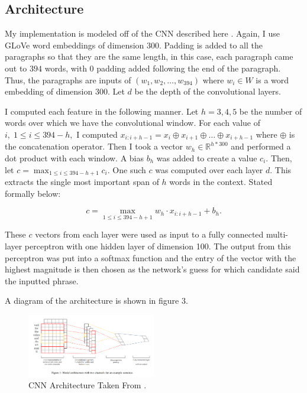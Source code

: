 \documentclass{article}
\begin{document}
\subsection{Architecture}
My implementation is modeled off of the CNN described here \cite{cnnpaper}. Again, I use GLoVe word embeddings of dimension 300. Padding is added to all the paragraphs so that they are the same length, in this case, each paragraph came out to $394$ words, with 0 padding added following the end of the paragraph. Thus, the paragraphs are inputs of $(w_1,w_2,\dots,w_{394})$ where $w_i \in W$ is a word embedding of dimension 300. Let $d$ be the depth of the convolutional layers. 

I computed each feature in the following manner. Let $h=3,4,5$ be the number of words over which we have the convolutional window. For each value of $i, \; 1\leq i \leq 394-h,$ I computed $x_{i:i+h-1} = x_i \oplus x_{i+1} \oplus \dots \oplus x_{i+h-1}$ where $\oplus$ is the concatenation operator. Then I took a vector $w_h \in \mathbb{R}^{h*300}$ and performed a dot product with each window. A bias $b_h$ was added to create a value $c_i.$ Then, let $c = \max_{1 \leq i \leq 394 - h + 1} c_i.$ One such $c$ was computed over each layer $d.$ This extracts the single most important span of $h$ words in the context. Stated formally below:

\begin{equation} c = \max_{1 \leq i \leq 394 - h + 1} w_h \cdot x_{i:i+h-1} + b_h. \end{equation}

These $c$ vectors from each layer were used as input to a fully connected multi-layer perceptron with one hidden layer of dimension 100. The output from this perceptron was put into a softmax function and the entry of the vector with the highest magnitude is then chosen as the network’s guess for which candidate said the inputted phrase. 

A diagram of the architecture is shown in figure 3.

\begin{figure}[ht]
\caption{CNN Architecture Taken From \cite{cnnpaper}.}
\centering
\includegraphics[width=0.5\textwidth]{Diagram.png}
\end{figure}
\end{document}
